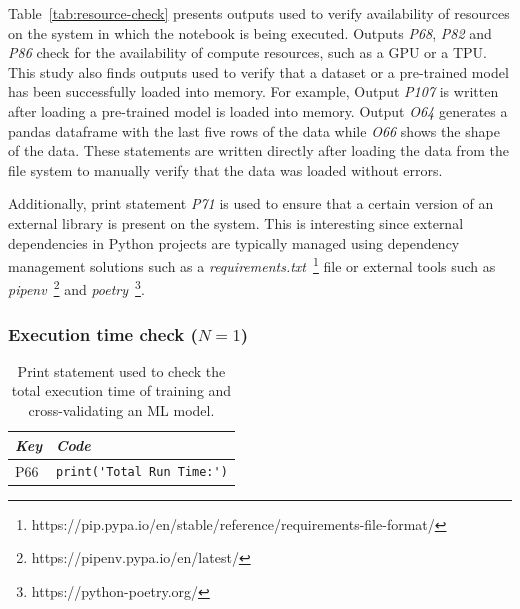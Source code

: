 Table~\ref{tab:resource-check} presents outputs used to verify availability of resources on the system in which the notebook is being executed. Outputs \emph{P68}, \emph{P82} and \emph{P86} check for the availability of compute resources, such as a GPU or a TPU. This study also finds outputs used to verify that a dataset or a pre-trained model has been successfully loaded into memory. For example, Output \emph{P107} is written after loading a pre-trained model is loaded into memory. Output \emph{O64} generates a pandas dataframe with the last five rows of the data while \emph{O66} shows the shape of the data. These statements are written directly after loading the data from the file system to manually verify that the data was loaded without errors.

Additionally, print statement \emph{P71} is used to ensure that a certain version of an external library is present on the system. This is interesting since external dependencies in Python projects are typically managed using dependency management solutions such as a \emph{requirements.txt}~\footnote{https://pip.pypa.io/en/stable/reference/requirements-file-format/} file or external tools such as \emph{pipenv}~\footnote{https://pipenv.pypa.io/en/latest/} and \emph{poetry}~\footnote{https://python-poetry.org/}.


\subsubsection{Execution time check ($N = 1$)}

\begin{table}
  \centering
  \caption{Print statement used to check the total execution time of training and cross-validating an ML model.}
  \begin{tabular}{@{}m{} m{}@{}}
    \toprule
    \emph{\textbf{Key}}&
    \emph{\textbf{Code}}\\
    \midrule

    P66&
    \lstinline[]$print('Total Run Time:')$\\
    \bottomrule
  \end{tabular}
  \label{tab:exec-time}
\end{table}

